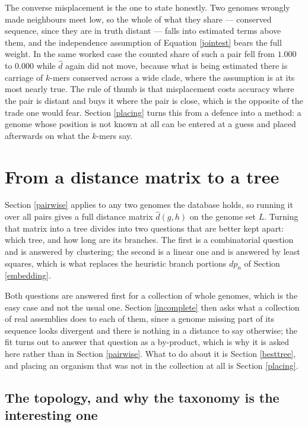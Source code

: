 \documentclass[pdflatex,sn-vancouver-num]{sn-jnl}
\begin{document}
The converse misplacement is the one to state honestly. Two genomes wrongly made neighbours meet
low, so the whole of what they share --- conserved sequence, since they are in truth distant --- falls
into estimated terms above them, and the independence assumption of Equation \eqref{jointest} bears
the full weight. In the same worked case the counted share of such a pair fell from $1.000$ to $0.000$
while $\widehat{d}$ again did not move, because what is being estimated there is carriage of $k$-mers
conserved across a wide clade, where the assumption is at its most nearly true. The rule of thumb is
that misplacement costs accuracy where the pair is distant and buys it where the pair is close, which
is the opposite of the trade one would fear. Section \ref{placing} turns this from a defence into a
method: a genome whose position is not known at all can be entered at a guess and placed afterwards on
what the $k$-mers say.

\section{From a distance matrix to a tree}\label{treefit}

Section \ref{pairwise} applies to any two genomes the database holds, so running it over all pairs
gives a full distance matrix $\widehat{d}(g,h)$ on the genome set $L$. Turning that matrix into a
tree divides into two questions that are better kept apart: which tree, and how long are its
branches. The first is a combinatorial question and is answered by clustering; the second is a
linear one and is answered by least squares, which is what replaces the heuristic branch portions
$dp_n$ of Section \ref{embedding}.

Both questions are answered first for a collection of whole genomes, which is the easy case and not
the usual one. Section \ref{incomplete} then asks what a collection of real assemblies does to each
of them, since a genome missing part of its sequence looks divergent and there is nothing in a
distance to say otherwise; the fit turns out to answer that question as a by-product, which is why it
is asked here rather than in Section \ref{pairwise}. What to do about it is
Section \ref{besttree}, and placing an organism that was not in the collection at all is
Section \ref{placing}.

\subsection{The topology, and why the taxonomy is the interesting one}\label{topologychoice}
\end{document}
